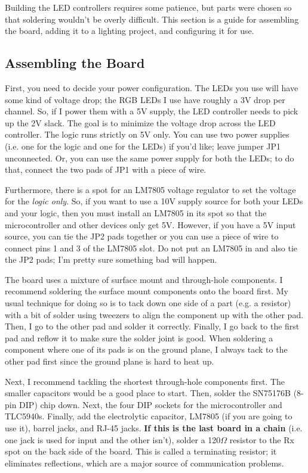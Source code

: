 
Building the LED controllers requires some patience, but parts were chosen so
that soldering wouldn't be overly difficult.  This section is a guide for
assembling the board, adding it to a lighting project, and configuring it for
use.

\subsection{Assembling the Board}

First, you need to decide your power configuration.  The LEDs you use will have
some kind of voltage drop; the RGB LEDs I use have roughly a 3V drop per
channel.  So, if I power them with a 5V supply, the LED controller needs to
pick up the 2V slack.  The goal is to minimize the voltage drop across the LED
controller.  The logic runs strictly on 5V only.  You can use two power
supplies (i.e. one for the logic and one for the LEDs) if you'd like; leave
jumper JP1 unconnected.  Or, you can use the same power supply for both the
LEDs; to do that, connect the two pads of JP1 with a piece of wire.

Furthermore, there is a spot for an LM7805 voltage regulator to set the voltage
for the \emph{logic only}.  So, if you want to use a 10V supply source for both
your LEDs and your logic, then you must install an LM7805 in its spot so that
the microcontroller and other devices only get 5V.  However, if you have a 5V
input source, you can tie the JP2 pads together or you can use a piece of wire
to connect pins 1 and 3 of the LM7805 slot.  Do not put an LM7805 in and also
tie the JP2 pads; I'm pretty sure something bad will happen.

The board uses a mixture of surface mount and through-hole components.  I
recommend soldering the surface mount components onto the board first.  My
usual technique for doing so is to tack down one side of a part (e.g. a
resistor) with a bit of solder using tweezers to align the component up with
the other pad.  Then, I go to the other pad and solder it correctly.  Finally,
I go back to the first pad and reflow it to make sure the solder joint is good.
When soldering a component where one of its pads is on the ground plane, I
always tack to the other pad first since the ground plane is hard to heat up.


Next, I recommend tackling the shortest through-hole components first.  The
smaller capacitors would be a good place to start.  Then, solder the SN75176B
(8-pin DIP) chip down.  Next, the four DIP sockets for the microcontroller and
TLC5940s.  Finally, add the electrolytic capacitor, LM7805 (if you are going to
use it), barrel jacks, and RJ-45 jacks.  \textbf{If this is the last board in a
chain} (i.e.  one jack is used for input and the other isn't), solder a
120$\Omega$ resistor to the Rx %
spot on the back side of the board.  This is called a terminating resistor; it
eliminates reflections, which are a major source of communication problems.


